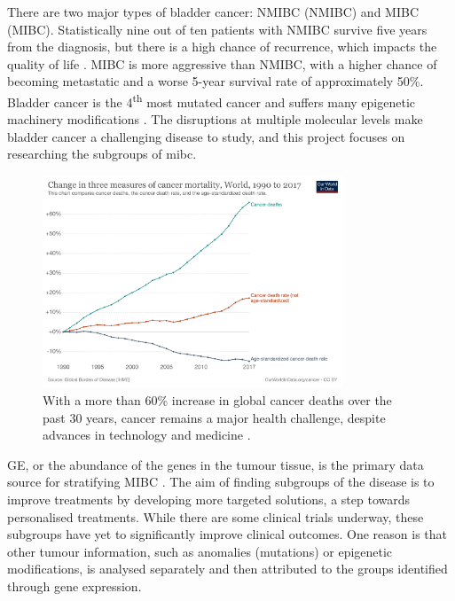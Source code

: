 There are two major types of bladder cancer: \gls{NMIBC} (NMIBC) and \gls{MIBC} (MIBC). Statistically nine out of ten patients with NMIBC survive five years from the diagnosis, but there is a high chance of recurrence, which impacts the quality of life \citep{Knowles2015-mu}. MIBC is more aggressive than NMIBC, with a higher chance of becoming metastatic and a worse 5-year survival rate of approximately 50\%. Bladder cancer is the 4\textsuperscript{th} most mutated cancer and suffers many epigenetic machinery modifications \citep{Alexandrov2013-gi}. The disruptions at multiple molecular levels make bladder cancer a challenging disease to study, and this project focuses on researching the subgroups of \acrlong{mibc}.



\begin{figure}[!t]
    \centering
    \includegraphics[width=0.8\textwidth,keepaspectratio]{Images/cancer-deaths-rate-and-age-standardized-rate-index.png}
    \caption[Cancer mortality]{With a more than 60\% increase in global cancer deaths over the past 30 years, cancer remains a major health challenge, despite advances in technology and medicine \citep{Roser2015-qb}.}
    \label{fig:cancer_death}
\end{figure}

\gls{GE}, or the abundance of the genes in the tumour tissue, is the primary data source for stratifying MIBC \citep{Kamoun2020-tj,Robertson2017-mg,Marzouka2018-ge}. The aim of finding subgroups of the disease is to improve treatments by developing more targeted solutions, a step towards personalised treatments. While there are some clinical trials \citep{Griffin2024-zr} underway, these subgroups have yet to significantly improve clinical outcomes. One reason is that other tumour information, such as anomalies (mutations) or epigenetic modifications, is analysed separately and then attributed to the groups identified through gene expression.

